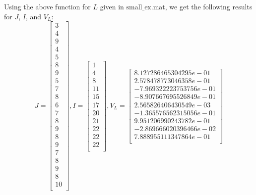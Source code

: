 \documentclass[12pt]{article}
\begin{document}
\begin{itemize}
Using the above function for $L$ given in $\text{small\_ex.mat}$, we get the following results for $J$, $I$, and $V_L$:\\
$$J = \begin{bmatrix} 
3\\
     4\\
     9\\
     4\\
     5\\
     8\\
     9\\
     5\\
     7\\
     8\\
     6\\
     7\\
     8\\
     9\\
     8\\
     9\\
     7\\
     8\\
     9\\
     8\\
    10\\
\end{bmatrix}, I = \begin{bmatrix}
1\\
     4\\
     8\\
    11\\
    15\\
    17\\
    20\\
    21\\
    22\\
    22\\
    22\\
\end{bmatrix}, V_L = \begin{bmatrix}
8.127286465304295e-01\\
     2.578478773046358e-01\\
    -7.969322223753756e-01\\
    -8.907667695526849e-01\\
     2.565826406430549e-03\\
    -1.365576562315056e-01\\
     9.951206990243782e-01\\
    -2.869666020396466e-02\\
     7.888955111347864e-01\\

\end{bmatrix}$$
\end{itemize}
\end{document}

